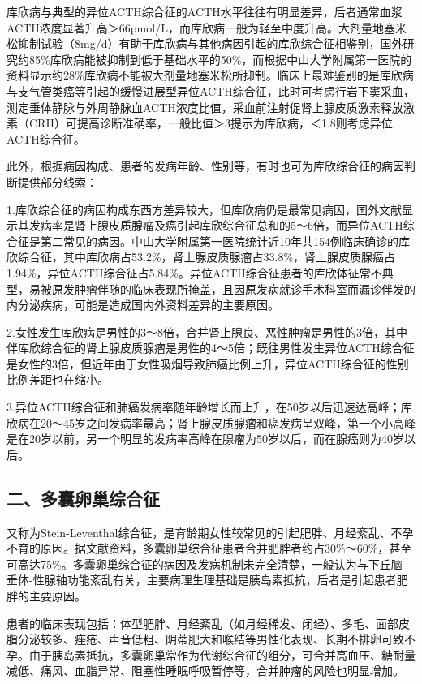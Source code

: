 库欣病与典型的异位ACTH综合征的ACTH水平往往有明显差异，后者通常血浆ACTH浓度显著升高＞66pmol/L，而库欣病一般为轻至中度升高。大剂量地塞米松抑制试验（8mg/d）有助于库欣病与其他病因引起的库欣综合征相鉴别，国外研究约85\%库欣病能被抑制到低于基础水平的50\%，而根据中山大学附属第一医院的资料显示约28\%库欣病不能被大剂量地塞米松所抑制。临床上最难鉴别的是库欣病与支气管类癌等引起的缓慢进展型异位ACTH综合征，此时可考虑行岩下窦采血，测定垂体静脉与外周静脉血ACTH浓度比值，采血前注射促肾上腺皮质激素释放激素（CRH）可提高诊断准确率，一般比值＞3提示为库欣病，＜1.8则考虑异位ACTH综合征。

此外，根据病因构成、患者的发病年龄、性别等，有时也可为库欣综合征的病因判断提供部分线索：

1.库欣综合征的病因构成东西方差异较大，但库欣病仍是最常见病因，国外文献显示其发病率是肾上腺皮质腺瘤及癌引起库欣综合征总和的5～6倍，而异位ACTH综合征是第二常见的病因。中山大学附属第一医院统计近10年共154例临床确诊的库欣综合征，其中库欣病占53.2\%，肾上腺皮质腺瘤占33.8\%，肾上腺皮质腺癌占1.94\%，异位ACTH综合征占5.84\%。异位ACTH综合征患者的库欣体征常不典型，易被原发肿瘤伴随的临床表现所掩盖，且因原发病就诊手术科室而漏诊伴发的内分泌疾病，可能是造成国内外资料差异的主要原因。

2.女性发生库欣病是男性的3～8倍，合并肾上腺良、恶性肿瘤是男性的3倍，其中伴库欣综合征的肾上腺皮质腺瘤是男性的4～5倍；既往男性发生异位ACTH综合征是女性的3倍，但近年由于女性吸烟导致肺癌比例上升，异位ACTH综合征的性别比例差距也在缩小。

3.异位ACTH综合征和肺癌发病率随年龄增长而上升，在50岁以后迅速达高峰；库欣病在20～45岁之间发病率最高；肾上腺皮质腺瘤和癌发病呈双峰，第一个小高峰是在20岁以前，另一个明显的发病率高峰在腺瘤为50岁以后，而在腺癌则为40岁以后。

\subsection{二、多囊卵巢综合征}

又称为Stein-Leventhal综合征，是育龄期女性较常见的引起肥胖、月经紊乱、不孕不育的原因。据文献资料，多囊卵巢综合征患者合并肥胖者约占30\%～60\%，甚至可高达75\%。多囊卵巢综合征的病因及发病机制未完全清楚，一般认为与下丘脑-垂体-性腺轴功能紊乱有关，主要病理生理基础是胰岛素抵抗，后者是引起患者肥胖的主要原因。

患者的临床表现包括：体型肥胖、月经紊乱（如月经稀发、闭经）、多毛、面部皮脂分泌较多、痤疮、声音低粗、阴蒂肥大和喉结等男性化表现、长期不排卵可致不孕。由于胰岛素抵抗，多囊卵巢常作为代谢综合征的组分，可合并高血压、糖耐量减低、痛风、血脂异常、阻塞性睡眠呼吸暂停等，合并肿瘤的风险也明显增加。

